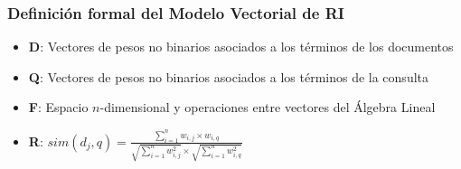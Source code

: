 \documentclass[
10pt, %
aspectratio=169, %
]{beamer}
\begin{document}
	\begin{frame}
		
		\frametitle{Definición formal del Modelo Vectorial de RI}
		
		\begin{itemize}
			
			\item[] \textbf{D}: Vectores de pesos no binarios asociados a los términos de los documentos \\[2mm]
			
			\item[] \textbf{Q}: Vectores de pesos no binarios asociados a los términos de la consulta \\[2mm]
			
			\item[] \textbf{F}: Espacio $n$-dimensional y operaciones entre vectores del Álgebra Lineal \\[2mm]
			
			\item[] \textbf{R}: $sim(d_j, q) = \frac{\sum_{i=1}^{n} w_{i, j} \times w_{i, q}}{\sqrt{\sum_{i=1}^{n} w_{i, j}^2} \times \sqrt{\sum_{i=1}^{n} w_{i, q}^2}}$ 
			
		\end{itemize}
		
	\end{frame}
	
\end{document}
